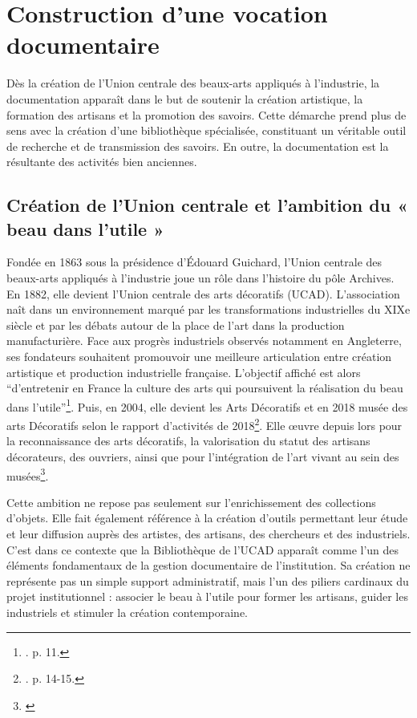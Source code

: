 \section{Construction d’une vocation documentaire}

Dès la création de l’Union centrale des beaux-arts appliqués à l’industrie, la documentation apparaît dans le but de soutenir la création artistique, la formation des artisans et la promotion des savoirs. Cette démarche prend plus de sens avec la création d’une bibliothèque spécialisée, constituant un véritable outil de recherche et de transmission des savoirs. En outre, la documentation est la résultante des activités bien anciennes.
 

\subsection*{Création de l’Union centrale et l’ambition du « beau dans l’utile »}

Fondée en 1863 sous la présidence d’Édouard Guichard, l’Union centrale des beaux-arts appliqués à l’industrie joue un rôle dans l’histoire du pôle Archives. En 1882, elle devient l’Union centrale des arts décoratifs (UCAD). L’association naît dans un environnement marqué par les transformations industrielles du XIXe siècle et par les débats autour de la place de l’art dans la production manufacturière. Face aux progrès industriels observés notamment en Angleterre, ses fondateurs souhaitent promouvoir une meilleure articulation entre création artistique et production industrielle française. L’objectif affiché est alors \enquote{d’entretenir en France la culture des arts qui poursuivent la réalisation du beau dans l’utile}\footnote{\cite{brunhammer-1992}. p. 11.}. Puis, en 2004, elle devient les Arts Décoratifs et en 2018 musée des arts Décoratifs selon le rapport d'activités de 2018\footnote{\cite{JP801-rapports}. p. 14-15.}. Elle œuvre depuis lors pour la reconnaissance des arts décoratifs, la valorisation du statut des artisans décorateurs, des ouvriers, ainsi que pour l’intégration de l’art vivant au sein des musées\footnote{\cite{mad-depuis-1864}}.

Cette ambition ne repose pas seulement sur l’enrichissement des collections d’objets. Elle fait également référence à la création d’outils permettant leur étude et leur diffusion auprès des artistes, des artisans, des chercheurs et des industriels. C’est dans ce contexte que la Bibliothèque de l’UCAD apparaît comme l’un des éléments fondamentaux de la gestion documentaire de l’institution. Sa création ne représente pas un simple support administratif, mais l’un des piliers cardinaux du projet institutionnel : associer le beau à l’utile pour former les artisans, guider les industriels et stimuler la création contemporaine.


